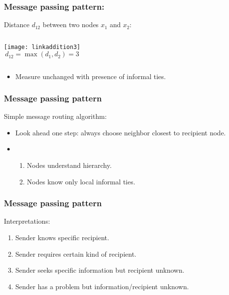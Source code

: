\begin{frame}
  \frametitle{Message passing pattern:}

  \begin{block}{Distance $d_{12}$ between two nodes $x_1$ and $x_2$:}
    \bigskip
    \begin{columns}
      \texttt{[image: linkaddition3]}
      $$
      d_{12} = \max(d_1,d_2) =3
      $$
    \end{columns}
    \bigskip
    \begin{itemize}    
    \item 
      Measure unchanged with presence of informal ties.
    \end{itemize}
  \end{block}
\end{frame}

\begin{frame}
  \frametitle{Message passing pattern}

  \begin{block}{Simple message routing algorithm:} 
    \begin{itemize}
    \item<1->
      Look ahead one step:
      always choose neighbor closest to recipient node.
    \item<2->
      \begin{enumerate}
      \item 
        Nodes understand hierarchy.
      \item 
        Nodes know only local informal ties.
      \end{enumerate}
    \end{itemize}
  \end{block}

\end{frame}


\begin{frame}
  \frametitle{Message passing pattern}

  \begin{block}{Interpretations:}
    \begin{enumerate}
    \item<1->
      Sender knows specific recipient.
    \item<2->
      Sender requires certain kind of recipient.
    \item<3->
      Sender seeks specific information but recipient unknown.
    \item<4->
      Sender has a problem but information/recipient unknown.
    \end{enumerate}

  \end{block}

\end{frame}

